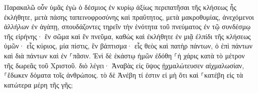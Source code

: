 \documentclass{openreader}
\begin{document}
Παρακαλῶ οὖν ὑμᾶς ἐγὼ ὁ δέσμιος ἐν κυρίῳ ἀξίως περιπατῆσαι τῆς κλήσεως ἧς ἐκλήθητε, 
μετὰ πάσης ταπεινοφροσύνης καὶ πραΰτητος, μετὰ μακροθυμίας, ἀνεχόμενοι ἀλλήλων ἐν ἀγάπῃ, 
σπουδάζοντες τηρεῖν τὴν ἑνότητα τοῦ πνεύματος ἐν τῷ συνδέσμῳ τῆς εἰρήνης· 
ἓν σῶμα καὶ ἓν πνεῦμα, καθὼς καὶ ἐκλήθητε ἐν μιᾷ ἐλπίδι τῆς κλήσεως ὑμῶν· 
εἷς κύριος, μία πίστις, ἓν βάπτισμα· 
εἷς θεὸς καὶ πατὴρ πάντων, ὁ ἐπὶ πάντων καὶ διὰ πάντων καὶ ἐν ⸀πᾶσιν. 
Ἑνὶ δὲ ἑκάστῳ ἡμῶν ἐδόθη ⸀ἡ χάρις κατὰ τὸ μέτρον τῆς δωρεᾶς τοῦ Χριστοῦ. 
διὸ λέγει· Ἀναβὰς εἰς ὕψος ᾐχμαλώτευσεν αἰχμαλωσίαν, ⸀ἔδωκεν δόματα τοῖς ἀνθρώποις. 
τὸ δὲ Ἀνέβη τί ἐστιν εἰ μὴ ὅτι καὶ ⸀κατέβη εἰς τὰ κατώτερα μέρη τῆς γῆς; 
\end{document}
